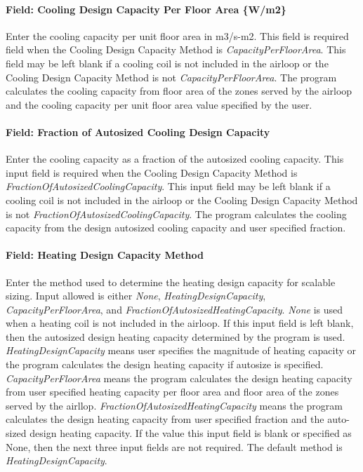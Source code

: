 \paragraph{Field: Cooling Design Capacity Per Floor Area \{W/m2\}}\label{field-cooling-design-capacity-per-floor-area-wm2-1}

Enter the cooling capacity per unit floor area in m3/s-m2. This field is required field when the Cooling Design Capacity Method is \emph{CapacityPerFloorArea}. This field may be left blank if a cooling coil is not included in the airloop or the Cooling Design Capacity Method is not \emph{CapacityPerFloorArea}. The program calculates the cooling capacity from floor area of the zones served by the airloop and the cooling capacity per unit floor area value specified by the user.

\paragraph{Field: Fraction of Autosized Cooling Design Capacity}\label{field-fraction-of-autosized-cooling-design-capacity-1}

Enter the cooling capacity as a fraction of the autosized cooling capacity. This input field is required when the Cooling Design Capacity Method is \emph{FractionOfAutosizedCoolingCapacity}. This input field may be left blank if a cooling coil is not included in the airloop or the Cooling Design Capacity Method is not \emph{FractionOfAutosizedCoolingCapacity}. The program calculates the cooling capacity from the design autosized cooling capacity and user specified fraction.

\paragraph{Field: Heating Design Capacity Method}\label{field-heating-design-capacity-method-1}

Enter the method used to determine the heating design capacity for scalable sizing. Input allowed is either \emph{None}, \emph{HeatingDesignCapacity}, \emph{CapacityPerFloorArea}, and \emph{FractionOfAutosizedHeatingCapacity}. \emph{None} is used when a heating coil is not included in the airloop. If this input field is left blank, then the autosized design heating capacity determined by the program is used. \emph{HeatingDesignCapacity} means user specifies the magnitude of heating capacity or the program calculates the design heating capacity if autosize is specified. \emph{CapacityPerFloorArea} means the program calculates the design heating capacity from user specified heating capacity per floor area and floor area of the zones served by the airllop. \emph{FractionOfAutosizedHeatingCapacity} means the program calculates the design heating capacity from user specified fraction and the auto-sized design heating capacity. If the value this input field is blank or specified as None, then the next three input fields are not required. The default method is \emph{HeatingDesignCapacity}.

